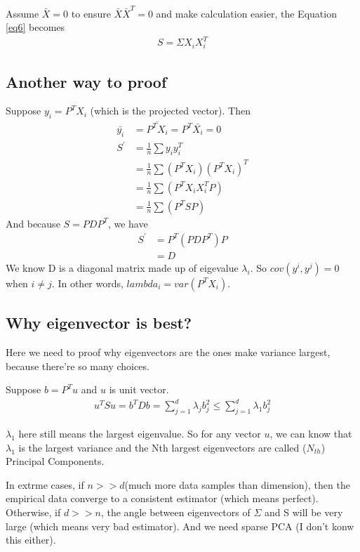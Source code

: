 \documentclass[11pt]{article}
\begin{document}
Assume $\bar{X}=0$ to ensure $\bar{X}\bar{X}^T=0$ and make calculation easier, the Equation \ref{eq6} becomes
\begin{align}
  S=\Sigma X_i X_i^T
\end{align}

\subsection{Another way to proof}

Suppose %
$y_i=P^TX_i$ (which is the projected vector). Then
\begin{align}
  \bar{y_i} & = \overline{P^TX_i} = P^T\bar{X_i} = 0\\
  S^\prime & = \frac{1}{n}\sum y_iy_i^T\\
  &=\frac{1}{n}\sum (P^TX_i)(P^TX_i)^T\\
  &=\frac{1}{n}\sum (P^TX_iX_i^TP)\\
  &=\frac{1}{n}\sum (P^TSP)
\end{align}
And because $S=PDP^T$, we have
\begin{align}
  S^\prime &= P^T(PDP^T)P\\
  & = D
\end{align}
We know D is a diagonal matrix made up of eigevalue $\lambda_i$. So $cov(y^i,y^j)=0$ when $i\neq j$. In other words, $lambda_i = var(P^TX_i)$.

\subsection{Why eigenvector is best?}
\indent
Here we need to proof why eigenvectors are the ones make variance largest, because there're so many choices.

Suppose $b=P^Tu$ and $u$ is unit vector.
\begin{align}
  u^TSu = b^TDb=\sum_{j=1}^d \lambda_j b_j^2 \leq \sum_{j=1}^d \lambda_1 b_j^2 
\end{align}

$\lambda_1$ here still means the largest eigenvalue. So for any vector $u$, we can know that $\lambda_1$ is the largest variance and the Nth largest eigenvectors are called ($N_{th}$) Principal Components.

In extrme cases, if $n >> d$(much more data samples than dimension), then the empirical data converge to a consistent estimator (which means perfect). Otherwise, if $d >> n$, the angle between eigenvectors of $\Sigma$ and S will be very large (which means very bad estimator). And we need sparse PCA (I don't konw this either).
\end{document}

